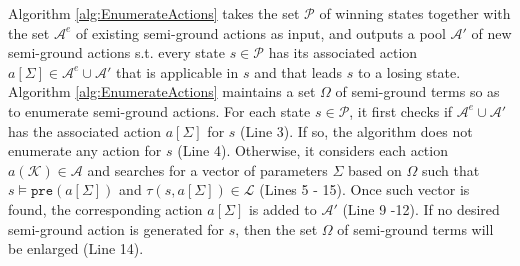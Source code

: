 \documentclass[review]{elsarticle}
\newcommand{\parmset}{\mathcal{K}}
\newcommand{\positiveSet}{\mathcal{P}}
\newcommand{\loseSet}{\mathcal{L}}
\newcommand{\expVec}{\Sigma}
\newcommand{\act}{\mathcal{A}}
\newcommand{\pre}{\mathtt{pre}}
\newcommand{\suc}{\tau}
\begin{document}
Algorithm \ref{alg:EnumerateActions} takes the set $\positiveSet$ of winning states together with the set $\act^e$ of existing semi-ground actions as input, and outputs a pool $\act'$ of new semi-ground actions s.t. every state $s \in \positiveSet$ has its associated action $a[\expVec] \in \act^e \cup \act'$ that is applicable in $s$ and that leads $s$ to a losing state.
Algorithm \ref{alg:EnumerateActions} maintains a set $\Omega$ of semi-ground terms so as to enumerate semi-ground actions.
For each state $s \in \positiveSet$, it first checks if $\act^e \cup \act'$ has the associated action $a[\expVec]$ for $s$ (Line 3).
If so, the algorithm does not enumerate any action for $s$ (Line 4).
Otherwise, it considers each action $a(\parmset) \in \act$ and searches for a vector of parameters $\expVec$ based on $\Omega$ such that $s \models \pre(a[\expVec])$ and $\suc(s, a[\expVec]) \in \loseSet$ (Lines 5 - 15).
Once such vector is found, the corresponding action $a[\expVec]$ is added to $\act'$ (Line 9 -12).
If no desired semi-ground action is generated for $s$, then the set $\Omega$ of semi-ground terms will be enlarged (Line 14).
\end{document}
